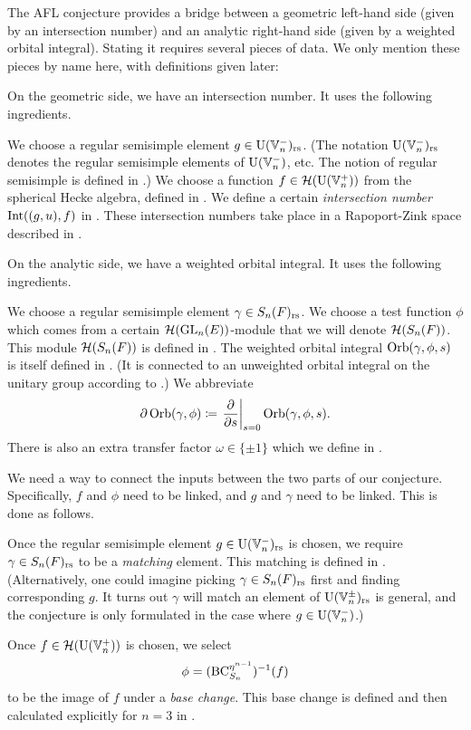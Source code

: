 The AFL conjecture provides a bridge between a geometric left-hand side
(given by an intersection number)
and an analytic right-hand side (given by a weighted orbital integral).
Stating it requires several pieces of data.
We only mention these pieces by name here, with definitions given later:
\begin{itemize}
  \ii On the geometric side, we have an intersection number.
  It uses the following ingredients.
  \begin{itemize}
    \ii We choose a regular semisimple element $g \in \operatorname{U}(\mathbb V_n^-)_{\mathrm{rs}}$.
    (The notation $\operatorname{U}(\mathbb V_n^-)_{\mathrm{rs}}$ denotes the regular semisimple elements of $\operatorname{U}(\mathbb V_n^-)$, etc.
    The notion of regular semisimple is defined in .)
    \ii We choose a function $f \in \mathcal H(\operatorname{U}(\mathbb V_n^+))$ from the spherical Hecke algebra,
    defined in .
    \ii We define a certain \emph{intersection number} $\operatorname{Int}((g,u), f)$
    in .
    These intersection numbers take place in a Rapoport-Zink space
    described in .
  \end{itemize}

  \ii On the analytic side, we have a weighted orbital integral.
  It uses the following ingredients.
  \begin{itemize}
    \ii We choose a regular semisimple element $\gamma \in S_n(F)_{\mathrm{rs}}$.
    \ii We choose a test function $\phi$ which comes
    from a certain $\mathcal H(\operatorname{GL}_n(E))$-module that we will denote $\mathcal H(S_n(F))$.
    This module $\mathcal H(S_n(F))$ is defined in .
    \ii The weighted orbital integral $\operatorname{Orb}(\gamma, \phi, s)$
    is itself defined in .
    (It is connected to an unweighted orbital integral on the unitary group
    according to .)
    We abbreviate
    \[ \partial \operatorname{Orb}(\gamma, \phi)
      \coloneqq \left. \pdv{}{s} \right\rvert_{s=0} \operatorname{Orb}(\gamma, \phi, s). \]
    \ii There is also an extra transfer factor $\omega \in \{\pm1\}$
    which we define in .
  \end{itemize}

  \ii We need a way to connect the inputs between the two parts of our conjecture.
  Specifically, $f$ and $\phi$ need to be linked, and $g$ and $\gamma$ need to be linked.
  This is done as follows.
  \begin{itemize}
    \ii Once the regular semisimple element $g \in \operatorname{U}(\mathbb V_n^-)_{\mathrm{rs}}$ is chosen,
    we require $\gamma \in S_n(F)_{\mathrm{rs}}$ to be a \emph{matching} element.
    This matching is defined in .
    (Alternatively, one could imagine picking $\gamma \in S_n(F)_{\mathrm{rs}}$ first
    and finding corresponding $g$.
    It turns out $\gamma$ will match an element of $\operatorname{U}(\mathbb V_n^\pm)_{\mathrm{rs}}$ is general,
    and the conjecture is only formulated in the case where $g \in \operatorname{U}(\mathbb V_n^-)$.)

    \ii Once $f \in \mathcal H(\operatorname{U}(\mathbb V_n^+))$ is chosen, we select
    \[ \phi = (\operatorname{BC}_{S_n}^{\eta^{n-1}})^{-1}(f) \]
    to be the image of $f$ under a \emph{base change}.
    This base change is defined and then calculated explicitly for $n = 3$ in .
  \end{itemize}
\end{itemize}
